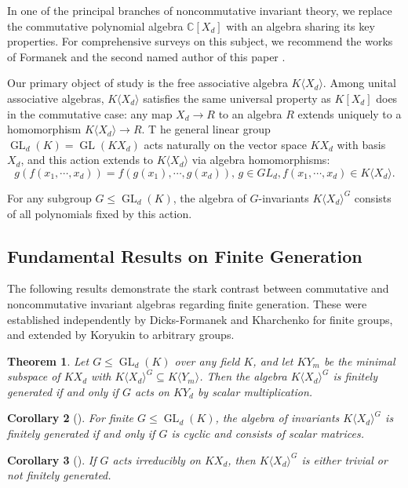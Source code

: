 \documentclass{amsart}[12pt]
\newtheorem{theorem}{Theorem}%
\newtheorem{corollary}[theorem]{Corollary}
\theoremstyle{definition}
\DeclareMathOperator{\GL}{GL}
\newcommand{\KXd}{K\langle X_d\rangle}
\begin{document}
In one of the principal branches of noncommutative invariant theory, we replace the commutative polynomial algebra $\mathbb{C}[X_d]$ with an algebra sharing its key properties.
For comprehensive surveys on this subject, we recommend the works of Formanek \cite{Fo} and the second named author of this paper \cite{Dr1}.

Our primary object of study is the free associative algebra $\KXd$.
Among unital associative algebras, $\KXd$ satisfies the same universal property as $K[X_d]$ does in the commutative case:
any map $X_d \to R$ to an algebra $R$ extends uniquely to a homomorphism $\KXd \to R$. T
he general linear group $\GL_d(K) = \GL(KX_d)$ acts naturally on the vector space $KX_d$ with basis $X_d$, and this action extends to $\KXd$ via algebra homomorphisms:
\[
g(f(x_1,\cdots, x_d )) = f(g(x_1),\cdots, g(x_d)),\, g \in GL_d , f(x_1,\cdots, x_d ) \in \KXd.	
\]

For any subgroup $G \leq \GL_d(K)$, the algebra of $G$-invariants $\KXd^G$ consists of all polynomials fixed by this action.

\subsection{Fundamental Results on Finite Generation}

The following results demonstrate the stark contrast between commutative and noncommutative invariant algebras regarding finite generation.
These were established independently by Dicks-Formanek \cite{DiFo} and Kharchenko \cite{Kh2} for finite groups, and extended by Koryukin \cite{Kor} to arbitrary groups.

\begin{theorem}
\label{noncommutative finite generation}
Let $G \leq \GL_d(K)$ over any field $K$, and let $KY_m$ be the minimal subspace of $KX_d$ with $\KXd^G \subseteq K\langle Y_m\rangle$.
Then the algebra $\KXd^G$ is finitely generated if and only if $G$ acts on $KY_d$ by scalar multiplication.
\end{theorem}

\begin{corollary}[{\cite{DiFo, Kh2}}]
For finite $G \leq \GL_d(K)$, the algebra of invariants $\KXd^G$ is finitely generated if and only if $G$ is cyclic and consists of scalar matrices.
\end{corollary}

\begin{corollary}[{\cite{Kor}}]
	If $G$ acts irreducibly on $KX_d$, then $\KXd^G$ is either trivial or not finitely generated.
\end{corollary}
\end{document}
